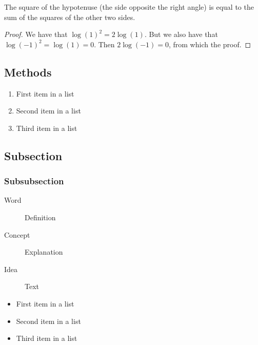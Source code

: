 \begin{theorem}[Pythagoras]
The square of the hypotenuse (the side opposite the right angle) is equal to the sum of the squares of the other two sides.
\end{theorem}

\begin{proof}
We have that $\log(1)^2 = 2\log(1)$.
But we also have that $\log(-1)^2=\log(1)=0$.
Then $2\log(-1)=0$, from which the proof.
\end{proof}

\subsection{Methods}

\lipsum[5] %

\begin{enumerate}[noitemsep] %
\item First item in a list
\item Second item in a list
\item Third item in a list
\end{enumerate}


\subsection{Subsection}

\lipsum[11] %

\subsubsection{Subsubsection}

\lipsum[12] %

\begin{description}
\item[Word] Definition
\item[Concept] Explanation
\item[Idea] Text
\end{description}

\lipsum[12] %

\begin{itemize}[noitemsep] %
\item First item in a list
\item Second item in a list
\item Third item in a list
\end{itemize}

